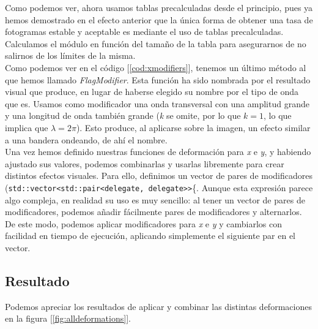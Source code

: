 Como podemos ver, ahora usamos tablas precalculadas desde el principio, pues ya hemos demostrado en el efecto anterior que la única forma de obtener una tasa de fotogramas estable y aceptable es mediante el uso de tablas precalculadas. Calculamos el módulo en función del tamaño de la tabla para asegurarnos de no salirnos de los límites de la misma.\\

Como podemos ver en el código [\ref{cod:xmodifiers}], tenemos un último método al que hemos llamado \emph{FlagModifier}. Esta función ha sido nombrada por el resultado visual que produce, en lugar de haberse elegido su nombre por el tipo de onda que es. Usamos como modificador una onda transversal con una amplitud grande y una longitud de onda también grande (\emph{k} se omite, por lo que \(k = 1\), lo que implica que \(\lambda = 2 \pi\)). Esto produce, al aplicarse sobre la imagen, un efecto similar a una bandera ondeando, de ahí el nombre.\\

Una vez hemos definido nuestras funciones de deformación para \emph{x} e \emph{y}, y habiendo ajustado sus valores, podemos combinarlas y usarlas libremente para crear distintos efectos visuales. Para ello, definimos un vector de pares de modificadores (\lstinline{std::vector<std::pair<delegate, delegate>>}\{. Aunque esta expresión parece algo compleja, en realidad su uso es muy sencillo: al tener un vector de pares de modificadores, podemos añadir fácilmente pares de modificadores y alternarlos. De este modo, podemos aplicar modificadores para \emph{x} e \emph{y} y cambiarlos con facilidad en tiempo de ejecución, aplicando simplemente el siguiente par en el vector.\\

\subsection{Resultado}

Podemos apreciar los resultados de aplicar y combinar las distintas deformaciones en la figura [\ref{fig:alldeformations}].


